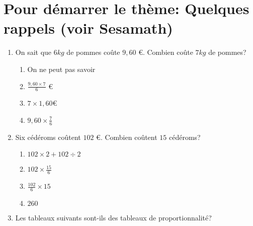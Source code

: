 \documentclass[10pt]{article}
\begin{document}
{\setlength{\baselineskip}{1.5\baselineskip}

\section{Pour démarrer le thème: Quelques rappels (voir Sesamath)}
 
\begin{enumerate}
\item On sait que $6 kg$ de pommes coûte $9,60$ \euro{}. Combien coûte $7kg$ de pommes?
\begin{enumerate}	
	\item On ne peut pas savoir
	\item $\frac{9,60 \times 7}{6}$ \euro{}
	\item $7 \times 1,60$\euro{}
	\item $9,60 \times \frac{7}{6}$
\end{enumerate}
\item Six cédéroms coûtent $102$ \euro{}. Combien coûtent $15$ cédéroms?
\begin{enumerate}	
	\item $102 \times 2 +102 \div 2$
	\item $102 \times \frac{15}{6}$
	\item $\frac{102}{6} \times 15$
	\item $260$
\end{enumerate}  
\item Les tableaux suivants sont-ils des tableaux de proportionnalité?
\end{enumerate}}
\end{document}
